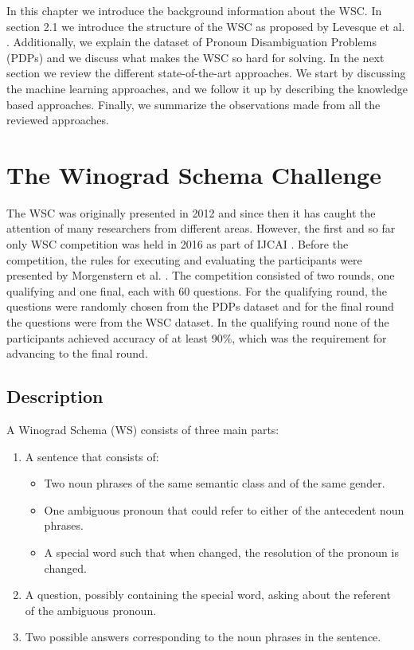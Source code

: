\label{Background}
In this chapter we introduce the background information about the WSC. In section 2.1 we introduce the structure of the WSC as proposed by Levesque et al. \cite{DBLP:conf/kr/LevesqueDM12}. 
Additionally, we explain the dataset of Pronoun Disambiguation Problems (PDPs) and we discuss what makes the WSC so hard for solving. In the next section we review the different state-of-the-art approaches. We start by discussing the machine learning approaches, and we follow it up by describing the knowledge based approaches. Finally, we summarize the observations made from all the reviewed approaches.

 
\section{The Winograd Schema Challenge}
\label{section:TheWinogradSchemaChallenge}

The WSC was originally presented in 2012 \cite{DBLP:conf/kr/LevesqueDM12} and since then it has caught the  attention of many researchers from different areas. However, the first and so far only WSC competition was held in 2016 as part of IJCAI \cite{ijcai}. Before the competition, the rules for executing and evaluating the participants were presented by Morgenstern et al. \cite{DBLP:journals/aim/MorgensternDO16}. The competition consisted of two rounds, one qualifying and one final, each with 60 questions. For the qualifying round, the questions were randomly chosen from the PDPs dataset and for the final round the questions were from the WSC dataset. In the qualifying round none of the participants achieved accuracy of at least 90\%, which was the requirement for advancing to the final round. 

\subsection{Description}
A Winograd Schema (WS) consists of three main parts:

\begin{enumerate}
	\item A sentence that consists of:
	\begin{itemize}
		\item Two noun phrases of the same semantic class and of the same gender.
		\item One ambiguous pronoun that could refer to either of the antecedent noun phrases.
		\item A special word such that when changed, the resolution of the pronoun is changed.
	\end{itemize}
    \item A question, possibly containing the special word, asking about the referent \\of the ambiguous pronoun.
    \item Two possible answers corresponding to the noun phrases in the sentence.
\end{enumerate}

